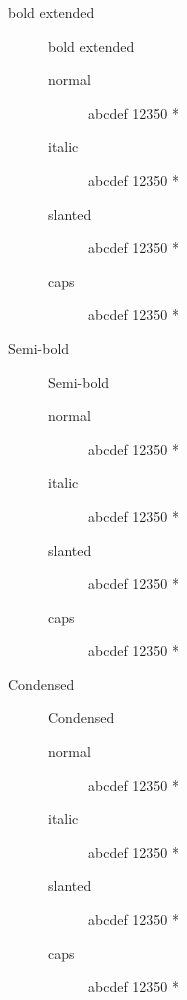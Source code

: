 \documentclass[12pt,a4paper]{report}
\begin{document}
\begin{description}
        \item [bold extended] bold extended
        \begin{description}
            \item [normal]  abcdef 12350 *
            \item [italic]  abcdef 12350 *
            \item [slanted]  abcdef 12350 *
            \item [caps]  abcdef 12350 *
        \end{description}
        \item [Semi-bold] Semi-bold
        \begin{description}
            \item [normal]  abcdef 12350 *
            \item [italic]  abcdef 12350 *
            \item [slanted]  abcdef 12350 *
            \item [caps]  abcdef 12350 *
        \end{description}
        \item [Condensed] Condensed
        \begin{description}
            \item [normal]  abcdef 12350 *
            \item [italic]  abcdef 12350 *
            \item [slanted]  abcdef 12350 *
            \item [caps]  abcdef 12350 *
        \end{description}

    \end{description}
\end{document}
